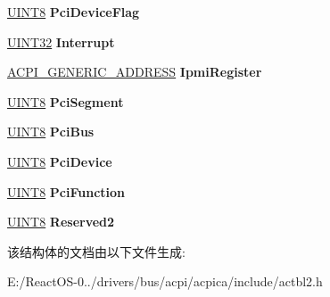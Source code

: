 \begin{DoxyCompactItemize}
\item 
\mbox{\label{structacpi__table__spmi_a8402aa9e664cc405076aaaf777d79444}} 
\hyperlink{_processor_bind_8h_ab27e9918b538ce9d8ca692479b375b6a}{U\+I\+N\+T8} {\bfseries Pci\+Device\+Flag}
\item 
\mbox{\label{structacpi__table__spmi_a0531e897ece7c9576240d9458c7c18be}} 
\hyperlink{_processor_bind_8h_ae1e6edbbc26d6fbc71a90190d0266018}{U\+I\+N\+T32} {\bfseries Interrupt}
\item 
\mbox{\label{structacpi__table__spmi_a0d8a337ce1982f233807c5652b386f9e}} 
\hyperlink{structacpi__generic__address}{A\+C\+P\+I\+\_\+\+G\+E\+N\+E\+R\+I\+C\+\_\+\+A\+D\+D\+R\+E\+SS} {\bfseries Ipmi\+Register}
\item 
\mbox{\label{structacpi__table__spmi_af48f097a4b301a7b0a1b7ddb31c4b8c4}} 
\hyperlink{_processor_bind_8h_ab27e9918b538ce9d8ca692479b375b6a}{U\+I\+N\+T8} {\bfseries Pci\+Segment}
\item 
\mbox{\label{structacpi__table__spmi_ae91f40e0d60e35def26f85b5d9c3c1e9}} 
\hyperlink{_processor_bind_8h_ab27e9918b538ce9d8ca692479b375b6a}{U\+I\+N\+T8} {\bfseries Pci\+Bus}
\item 
\mbox{\label{structacpi__table__spmi_a628c6c35090317f528c954ec69857003}} 
\hyperlink{_processor_bind_8h_ab27e9918b538ce9d8ca692479b375b6a}{U\+I\+N\+T8} {\bfseries Pci\+Device}
\item 
\mbox{\label{structacpi__table__spmi_a37f1c146d688bd83ae470ef2279e2d8f}} 
\hyperlink{_processor_bind_8h_ab27e9918b538ce9d8ca692479b375b6a}{U\+I\+N\+T8} {\bfseries Pci\+Function}
\item 
\mbox{\label{structacpi__table__spmi_a575208e0570a6b5e2cb7f550ac71a334}} 
\hyperlink{_processor_bind_8h_ab27e9918b538ce9d8ca692479b375b6a}{U\+I\+N\+T8} {\bfseries Reserved2}
\end{DoxyCompactItemize}


该结构体的文档由以下文件生成\+:\begin{DoxyCompactItemize}
\item 
E\+:/\+React\+O\+S-\/0../drivers/bus/acpi/acpica/include/actbl2.\+h\end{DoxyCompactItemize}
